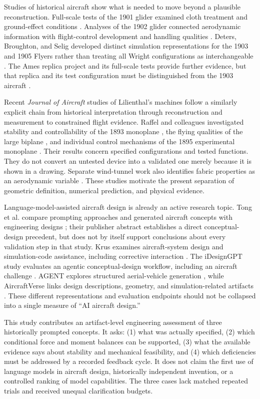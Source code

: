 \documentclass[11pt,a4paper]{article}
\begin{document}
Studies of historical aircraft show what is needed to move beyond a plausible reconstruction. Full-scale tests of the 1901 glider examined cloth treatment and ground-effect conditions \cite{ref8}. Analyses of the 1902 glider connected aerodynamic information with flight-control development and handling qualities \cite{ref7,ref9}. Deters, Broughton, and Selig developed distinct simulation representations for the 1903 and 1905 Flyers rather than treating all Wright configurations as interchangeable \cite{ref11}. The Ames replica project and its full-scale tests provide further evidence, but that replica and its test configuration must be distinguished from the 1903 aircraft \cite{ref12,ref13}.

Recent \emph{Journal of Aircraft} studies of Lilienthal's machines follow a similarly explicit chain from historical interpretation through reconstruction and measurement to constrained flight evidence. Raffel and colleagues investigated stability and controllability of the 1893 monoplane \cite{ref16}, the flying qualities of the large biplane \cite{ref17}, and individual control mechanisms of the 1895 experimental monoplane \cite{ref18}. Their results concern specified configurations and tested functions. They do not convert an untested device into a validated one merely because it is shown in a drawing. Separate wind-tunnel work also identifies fabric properties as an aerodynamic variable \cite{ref19}. These studies motivate the present separation of geometric definition, numerical prediction, and physical evidence.

Language-model-assisted aircraft design is already an active research topic. Tong et al. compare prompting approaches and generated aircraft concepts with engineering designs \cite{ref25}; their publisher abstract establishes a direct conceptual-design precedent, but does not by itself support conclusions about every validation step in that study. Krus examines aircraft-system design and simulation-code assistance, including corrective interaction \cite{ref26}. The iDesignGPT study evaluates an agentic conceptual-design workflow, including an aircraft challenge \cite{ref27}. AGENT explores structured aerial-vehicle generation \cite{ref28}, while AircraftVerse links design descriptions, geometry, and simulation-related artifacts \cite{ref29}. These different representations and evaluation endpoints should not be collapsed into a single measure of ``AI aircraft design.''

This study contributes an artifact-level engineering assessment of three historically prompted concepts. It asks: (1) what was actually specified, (2) which conditional force and moment balances can be supported, (3) what the available evidence says about stability and mechanical feasibility, and (4) which deficiencies must be addressed by a recorded feedback cycle. It does not claim the first use of language models in aircraft design, historically independent invention, or a controlled ranking of model capabilities. The three cases lack matched repeated trials and received unequal clarification budgets.
\end{document}
